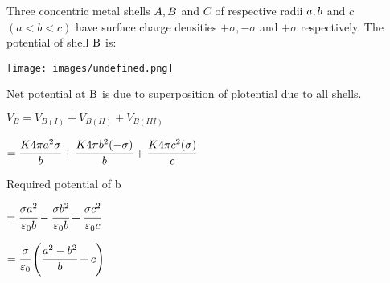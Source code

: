 \documentclass{article}
\begin{document}
Three concentric metal shells \(A,{\rm{ }}B\) and \(C\) of respective radii \(a,{\rm{ }}b\) and \(c\) \((a < b < c)\) have surface charge densities \( + \sigma , - \sigma \) and \( + \sigma \) respectively. The potential of shell \({\rm{B}}\) is:

\begin{center}
	\texttt{[image: images/undefined.png]}
\end{center}

Net potential at \({\rm{B}}\) is due to superposition of plotential due to all shells.

\({V_B} = {V_{B(I)}} + {V_{B(II)}} + {V_{B(III)}}\)

\( = \cfrac{{K4\pi {a^2}\sigma }}{b} + \cfrac{{K4\pi {b^2}( - \sigma )}}{b} + \cfrac{{K4\pi {c^2}(\sigma )}}{c}\)

Required potential of b

\( = \cfrac{{\sigma {a^2}}}{{{\varepsilon _0}b}} - \cfrac{{\sigma {b^2}}}{{{\varepsilon _0}b}} + \cfrac{{\sigma {c^2}}}{{{\varepsilon _0}c}}\)

\( = \cfrac{\sigma }{{{\varepsilon _0}}}\left( {\cfrac{{{a^2} - {b^2}}}{b} + c} \right)\)
\end{document}
